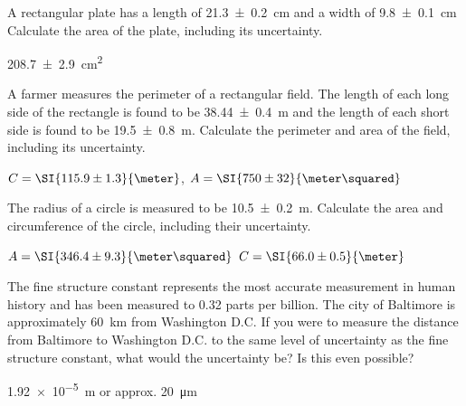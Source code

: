 



\begin{question}[ID=EA01,topic=units,difficulty=easy]
    A rectangular plate has a length of \SI{21.3\pm 0.2}{\centi\meter}
        and a width of \SI{9.8\pm 0.1}{\centi\meter}
    Calculate the area of the plate, including its uncertainty.
\end{question}
\begin{solution}
    \SI{208.7 \pm 2.9 }{\centi\meter\squared}
\end{solution}

\begin{question}[ID=EA02,topic=units,difficulty=easy]
    A farmer measures the perimeter of a rectangular field.
    The length of each long side of the rectangle is found to be \SI{38.44\pm 0.4}{\meter}
        and the length of each short side is found to be \SI{19.5\pm 0.8}{\meter}.
    Calculate the perimeter and area of the field, including its uncertainty.
\end{question}
\begin{solution}
    $C = \SI{115.9 \pm 1.3}{\meter}$,
    $A = \SI{750 \pm 32 }{\meter\squared}$
\end{solution}

\begin{question}[ID=EA03,topic=units,difficulty=easy]
    The radius of a circle is measured to be \SI{10.5\pm 0.2}{\meter}.
    Calculate the area and circumference of the circle, including their uncertainty.
\end{question}
\begin{solution}
    $A = \SI{346.4 \pm 9.3 }{\meter\squared}$
    $C = \SI{66.0 \pm 0.5}{\meter}$
\end{solution}

\begin{question}[ID=EA04,topic=units,difficulty=easy]
    The fine structure constant represents the most
        accurate measurement in human history and has
        been measured to 0.32 parts per billion.
    The city of Baltimore is approximately
        \SI{60}{\kilo\meter} from Washington D.C.
    If you were to measure the distance from Baltimore to
        Washington D.C. to the same level of uncertainty as
        the fine structure constant, what would the uncertainty be?
    Is this even possible?
\end{question}
\begin{solution}
    \SI{1.92e-5}{\meter} or approx. \SI{20}{\micro\meter}
\end{solution}

\endinput


